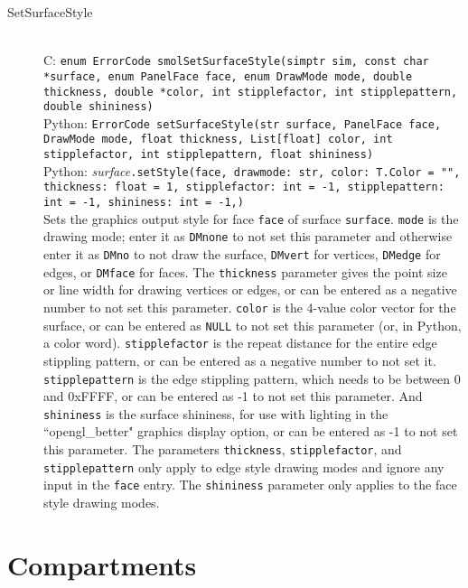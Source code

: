 \documentclass {book}
\newcommand {\ttt} {\texttt}
\begin{document}
\begin{description}
\item[SetSurfaceStyle]
\hfill \\
C: \ttt{enum ErrorCode smolSetSurfaceStyle(simptr sim, const char *surface, enum PanelFace face, enum DrawMode mode, double thickness, double *color, int stipplefactor, int stipplepattern, double shininess)}\\
Python: \ttt{ErrorCode setSurfaceStyle(str surface, PanelFace face, DrawMode mode, float thickness, List[float] color, int stipplefactor, int stipplepattern, float shininess)}\\
Python: \textit{surface}\ttt{.setStyle(face, drawmode: str, color: T.Color = "", thickness: float = 1, stipplefactor: int = -1, stipplepattern: int = -1, shininess: int = -1,)}\\
Sets the graphics output style for face \ttt{face} of surface \ttt{surface}. \ttt{mode} is the drawing mode; enter it as \ttt{DMnone} to not set this parameter and otherwise enter it as \ttt{DMno} to not draw the surface, \ttt{DMvert} for vertices, \ttt{DMedge} for edges, or \ttt{DMface} for faces. The \ttt{thickness} parameter gives the point size or line width for drawing vertices or edges, or can be entered as a negative number to not set this parameter. \ttt{color} is the 4-value color vector for the surface, or can be entered as \ttt{NULL} to not set this parameter (or, in Python, a color word). \ttt{stipplefactor} is the repeat distance for the entire edge stippling pattern, or can be entered as a negative number to not set it. \ttt{stipplepattern} is the edge stippling pattern, which needs to be between 0 and 0xFFFF, or can be entered as -1 to not set this parameter. And \ttt{shininess} is the surface shininess, for use with lighting in the ``opengl\_better" graphics display option, or can be entered as -1 to not set this parameter. The parameters \ttt{thickness}, \ttt{stipplefactor}, and \ttt{stipplepattern} only apply to edge style drawing modes and ignore any input in the \ttt{face} entry. The \ttt{shininess} parameter only applies to the face style drawing modes.

\end{description}

\section{Compartments}
\end{document}
